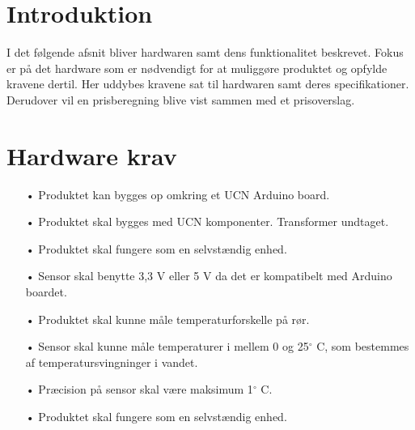 \section{Introduktion}
I det følgende afsnit bliver hardwaren samt dens funktionalitet beskrevet. Fokus er på det hardware som er nødvendigt for at muliggøre produktet og opfylde kravene dertil. \newline
Her uddybes kravene sat til hardwaren samt deres specifikationer. Derudover vil en prisberegning blive vist sammen med et prisoverslag.

\section{Hardware krav}
\begin{enumerate}
	\item[•]Produktet kan bygges op omkring et UCN Arduino board. 
	\item[•]Produktet skal bygges med UCN komponenter. Transformer undtaget.
	\item[•]Produktet skal fungere som en selvstændig enhed.
	\item[•]Sensor skal benytte 3,3 V eller 5 V da det er kompatibelt med Arduino boardet.
	\item[•]Produktet skal kunne måle temperaturforskelle på rør.
	\item[•]Sensor skal kunne måle temperaturer i mellem 0 og 25$^{\circ}$ C, som bestemmes af temperatursvingninger i vandet.
	\item[•]Præcision på sensor skal være maksimum 1$^{\circ}$ C.
	\item[•]Produktet skal fungere som en selvstændig enhed.
\end{enumerate}	
